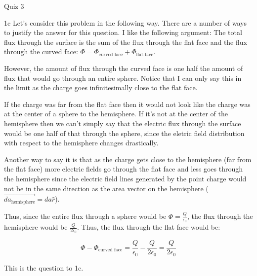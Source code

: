 \begin{homeworkProblem}{Quiz 3}
\begin{homeworkSection}{1c}
        Let's consider this problem in the following way. There are a
        number of ways to justify the answer for this question. I like
        the following argument: The total flux through the surface is
        the sum of the flux through the flat face and the flux through
        the curved face: $\Phi = \Phi_{\text{curved face}}+
        \Phi_{\text{flat face}} $.
        
        However, the amount of flux through
        the curved face is one half the amount of flux that would go
        through an entire sphere. Notice that I can only say this in the
        limit as the charge goes infinitesimally close to the flat face.
       
        If the charge was far from the flat face then it would not look
        like the charge was at the center of a sphere to the hemisphere.
        If it's not at the center of the hemisphere then we can't simply
        say that the electric flux through the surface would be one half
        of that through the sphere, since the eletric field distribution
        with respect to the hemisphere changes drastically.

        Another way to say it is that as the charge gets close to the
        hemisphere (far from the flat face) more electric fields go
        through the flat face and less goes through the hemisphere since
        the electric field lines generated by the point charge would not
        be in the same direction as the area vector on the hemisphere
        ($\vec{da_{\text{hemisphere}}} = da \hat{r}$).

        Thus, since the entire flux through a sphere would be $\Phi =
        \frac{Q}{\epsilon_0}$, the flux through the hemisphere would be
        $\frac{Q}{2\epsilon_0}$. Thus, the flux through the flat face
        would be:

        \[ \Phi - \Phi_{\text{curved face}} = \frac{Q}{\epsilon_0} -
        \frac{Q}{2\epsilon_0} = \frac{Q}{2\epsilon_0} \]

        This is the question to 1c.

    \end{homeworkSection}
\end{homeworkProblem}
